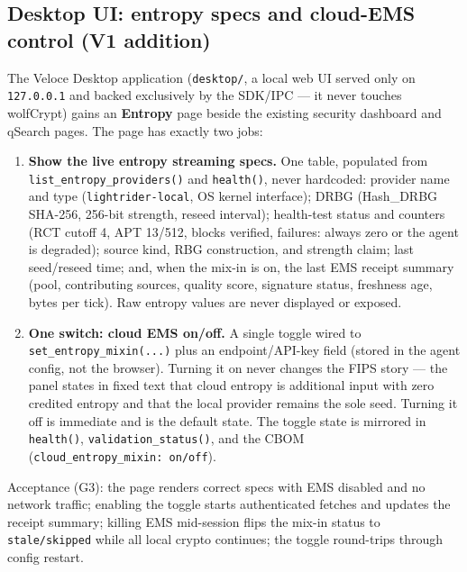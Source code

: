 \documentclass[10pt]{article}
\newcommand{\code}[1]{\texttt{\small #1}}
\begin{document}
\subsection{Desktop UI: entropy specs and cloud-EMS control (V1 addition)}
\label{sec:entropy-ui}

The Veloce Desktop application (\code{desktop/}, a local web UI served only on
\code{127.0.0.1} and backed exclusively by the SDK/IPC --- it never touches wolfCrypt)
gains an \textbf{Entropy} page beside the existing security dashboard and qSearch pages.
The page has exactly two jobs:

\begin{enumerate}
  \item \textbf{Show the live entropy streaming specs.} One table, populated from
        \code{list\_entropy\_providers()} and \code{health()}, never hardcoded:
        provider name and type (\code{lightrider-local}, OS kernel interface); DRBG
        (Hash\_DRBG SHA-256, 256-bit strength, reseed interval); health-test status and
        counters (RCT cutoff 4, APT 13/512, blocks verified, failures: always zero or
        the agent is degraded); source kind, RBG construction, and strength claim; last seed/reseed time; and, when the mix-in is on,
        the last EMS receipt summary (pool, contributing sources, quality score,
        signature status, freshness age, bytes per tick). Raw entropy values are never
        displayed or exposed.
  \item \textbf{One switch: cloud EMS on/off.} A single toggle wired to
        \code{set\_entropy\_mixin(...)} plus an endpoint/API-key field (stored in the
        agent config, not the browser). Turning it on never changes the FIPS story ---
        the panel states in fixed text that cloud entropy is additional input with zero
        credited entropy and that the local provider remains the sole seed. Turning it
        off is immediate and is the default state. The toggle state is mirrored in
        \code{health()}, \code{validation\_status()}, and the CBOM
        (\code{cloud\_entropy\_mixin:\ on/off}).
\end{enumerate}

Acceptance (G3): the page renders correct specs with EMS disabled and no network
traffic; enabling the toggle starts authenticated fetches and updates the receipt
summary; killing EMS mid-session flips the mix-in status to \code{stale/skipped} while
all local crypto continues; the toggle round-trips through config restart.

\end{document}
